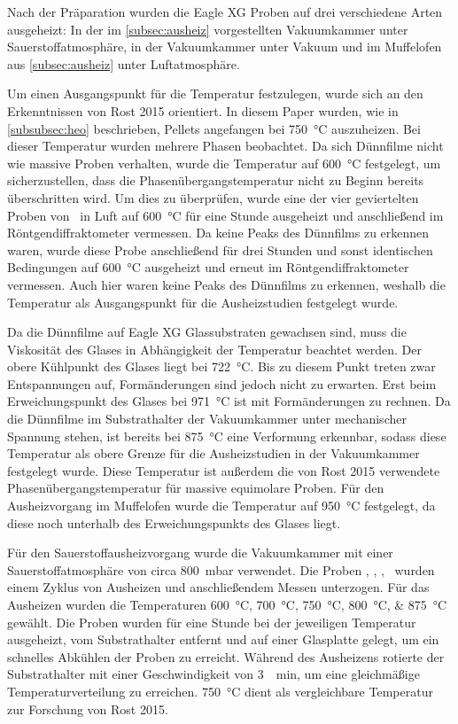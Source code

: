 Nach der Präparation wurden die Eagle XG Proben auf drei verschiedene Arten ausgeheizt:
In der im \cref{subsec:ausheiz} vorgestellten Vakuumkammer unter Sauerstoffatmosphäre, in der Vakuumkammer unter Vakuum
und im Muffelofen aus \cref{subsec:ausheiz} unter Luftatmosphäre.

Um einen Ausgangspunkt für die Temperatur festzulegen, wurde sich an den Erkenntnissen von Rost 2015 orientiert.
In diesem Paper wurden, wie in \cref{subsubsec:heo} beschrieben, Pellets angefangen bei \qty{750}{\degreeCelsius}
auszuheizen.
Bei dieser Temperatur wurden mehrere Phasen beobachtet.
Da sich Dünnfilme nicht wie massive Proben verhalten, wurde die Temperatur auf \qty{600}{\degreeCelsius} festgelegt,
um sicherzustellen, dass die Phasenübergangstemperatur nicht zu Beginn bereits überschritten wird.
Um dies zu überprüfen, wurde eine der vier geviertelten Proben von \sampletwo\ in Luft auf \qty{600}{\degreeCelsius}
für eine Stunde ausgeheizt und anschließend im Röntgendiffraktometer vermessen.
Da keine Peaks des Dünnfilms zu erkennen waren, wurde diese Probe anschließend für drei Stunden und sonst identischen
Bedingungen auf \qty{600}{\degreeCelsius} ausgeheizt und erneut im Röntgendiffraktometer vermessen.
Auch hier waren keine Peaks des Dünnfilms zu erkennen, weshalb die Temperatur als Ausgangspunkt für die Ausheizstudien
festgelegt wurde.

Da die Dünnfilme auf Eagle XG Glassubstraten gewachsen sind, muss die Viskosität des Glases in Abhängigkeit der
Temperatur beachtet werden.
Der obere Kühlpunkt des Glases liegt bei \qty{722}{\degreeCelsius}.
Bis zu diesem Punkt treten zwar Entspannungen auf, Formänderungen sind jedoch nicht zu erwarten.
Erst beim Erweichungspunkt des Glases bei \qty{971}{\degreeCelsius} ist mit Formänderungen zu rechnen.
Da die Dünnfilme im Substrathalter der Vakuumkammer unter mechanischer Spannung stehen, ist bereits bei
\qty{875}{\degreeCelsius} eine Verformung erkennbar, sodass diese Temperatur als obere Grenze für die Ausheizstudien
in der Vakuumkammer festgelegt wurde.
Diese Temperatur ist außerdem die von Rost 2015 verwendete Phasenübergangstemperatur für massive equimolare Proben.
Für den Ausheizvorgang im Muffelofen wurde die Temperatur auf \qty{950}{\degreeCelsius} festgelegt, da diese noch
unterhalb des Erweichungspunkts des Glases liegt.

Für den Sauerstoffausheizvorgang wurde die Vakuumkammer mit einer Sauerstoffatmosphäre von circa \qty{800}{\milli\bar}
verwendet.
Die Proben \samplethree, \sampleone, \sampletwo, \samplefour\ wurden einem Zyklus von Ausheizen und anschließendem
Messen unterzogen.
Für das Ausheizen wurden die Temperaturen \qtylist{600;700;750;800;875}{\degreeCelsius} gewählt.
Die Proben wurden für eine Stunde bei der jeweiligen Temperatur ausgeheizt, vom Substrathalter entfernt und auf einer
Glasplatte gelegt, um ein schnelles Abkühlen der Proben zu erreicht.
Während des Ausheizens rotierte der Substrathalter mit einer Geschwindigkeit von \qty{3}{\per\minute}, um eine
gleichmäßige Temperaturverteilung zu erreichen.
\qty{750}{\degreeCelsius} dient als vergleichbare Temperatur zur Forschung von Rost 2015.

